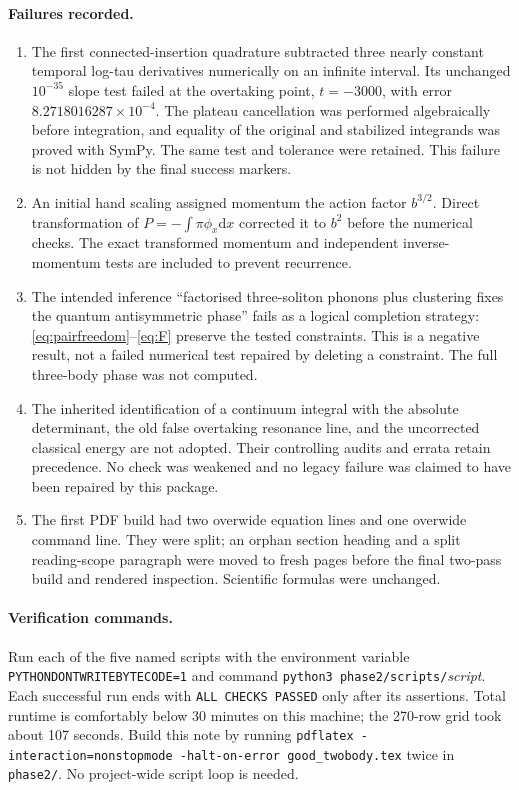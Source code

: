\documentclass[11pt,a4paper]{article}
\newcommand{\dd}{\mathrm d}
\newcommand{\file}[1]{\nolinkurl{#1}}
\begin{document}
\paragraph{Failures recorded.}
\begin{enumerate}
\item The first connected-insertion quadrature subtracted three nearly
constant temporal log-tau derivatives numerically on an infinite interval.
Its unchanged \(10^{-35}\) slope test failed at the overtaking point,
\(t=-3000\), with error \(8.2718016287\times10^{-4}\).
The plateau cancellation was performed algebraically before integration,
and equality of the original and stabilized integrands was proved with
SymPy. The same test and tolerance were retained. This failure is not
hidden by the final success markers.
\item An initial hand scaling assigned momentum the action factor
\(b^{3/2}\). Direct transformation of
\(P=-\int\pi\phi_x\dd x\) corrected it to \(b^2\) before
the numerical checks. The exact transformed momentum and independent
inverse-momentum tests are included to prevent recurrence.
\item The intended inference ``factorised three-soliton phonons plus
clustering fixes the quantum antisymmetric phase'' fails as a logical
completion strategy: \eqref{eq:pairfreedom}--\eqref{eq:F} preserve the
tested constraints. This is a negative result, not a failed numerical
test repaired by deleting a constraint. The full three-body phase was
not computed.
\item The inherited identification of a continuum integral with the
absolute determinant, the old false overtaking resonance line, and the
uncorrected classical energy are not adopted. Their controlling audits
and errata retain precedence. No check was weakened and no legacy
failure was claimed to have been repaired by this package.
\item The first PDF build had two overwide equation lines and one
overwide command line. They were split; an orphan section heading and
a split reading-scope paragraph were moved to fresh pages before the
final two-pass build and rendered inspection. Scientific formulas were unchanged.
\end{enumerate}

\paragraph{Verification commands.}
Run each of the five named scripts with the environment variable
\texttt{PYTHONDONTWRITEBYTECODE=1} and command
\texttt{python3 phase2/scripts/}\emph{script}.
Each successful run ends with \texttt{ALL CHECKS PASSED} only after its
assertions. Total runtime is comfortably below 30 minutes on this machine;
the 270-row grid took about 107 seconds. Build this note by running
\texttt{pdflatex -interaction=nonstopmode -halt-on-error good\_twobody.tex}
twice in \file{phase2/}. No project-wide script loop is needed.
\end{document}
